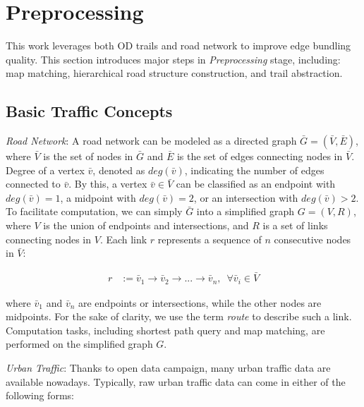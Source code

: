 \section{Preprocessing}
\label{sec:preprocess}

This work leverages both OD trails and road network to improve edge bundling quality.
This section introduces major steps in \textit{Preprocessing} stage, including: map matching, hierarchical road structure construction, and trail abstraction.

\subsection{Basic Traffic Concepts}
\textit{Road Network}:
A road network can be modeled as a directed graph $\bar{G} = (\bar{V}, \bar{E})$, where $\bar{V}$ is the set of nodes in $\bar{G}$ and $\bar{E}$ is the set of edges connecting nodes in $\bar{V}$.
Degree of a vertex $\bar{v}$, denoted as $deg(\bar{v})$, indicating the number of edges connected to $\bar{v}$.
By this, a vertex $\bar{v} \in \bar{V}$ can be classified as an endpoint with $deg(\bar{v})=1$, a midpoint with $deg(\bar{v})=2$, or an intersection with $deg(\bar{v})>2$.
To facilitate computation, we can simply $\bar{G}$ into a simplified graph $G = (V, R)$, where $V$ is the union of endpoints and intersections, and $R$ is a set of links connecting nodes in $V$.
Each link $r$ represents a sequence of $n$ consecutive nodes in $\bar{V}$:

\vspace{-5mm}
\begin{equation}
  \begin{aligned}
  	r &:= \bar{v}_1 \rightarrow \bar{v}_2 \rightarrow ... \rightarrow \bar{v}_n, \,\,\, \forall \bar{v}_i \in \bar{V}
  \end{aligned}
\end{equation}

\vspace{-2mm}
\noindent
where $\bar{v}_1$ and $\bar{v}_n$ are endpoints or intersections, while the other nodes are midpoints.
For the sake of clarity, we use the term \textit{route} to describe such a link.
Computation tasks, including shortest path query and map matching, are performed on the simplified graph $G$.

\vspace{1mm}
\noindent
\textit{Urban Traffic}:
Thanks to open data campaign, many urban traffic data are available nowadays.
Typically, raw urban traffic data can come in either of the following forms:

